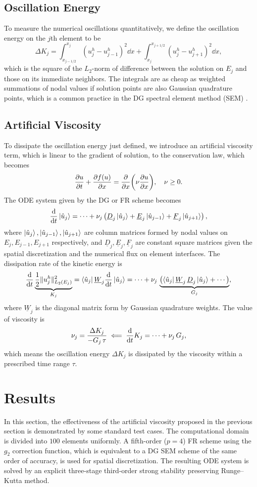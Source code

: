 \documentclass[10pt]{article}
\begin{document}
\subsection{Oscillation Energy}
To measure the numerical oscillations quantitatively, we define the oscillation energy on the $j$th element to be
$$
\Delta K_j = \int_{x_{j-1/2}}^{x_{j}}\left(u_{j}^{h}-u_{j-1}^{h}\right)^{2}\dd{x}+\int_{x_{j}}^{x_{j+1/2}}\left(u_{j}^{h}-u_{j+1}^{h}\right)^{2}\dd{x},
$$
which is the square of the $L_2$-norm of difference between the solution on $E_j$ and those on its immediate neighbors.
The integrals are as cheap as weighted summations of nodal values if solution points are also Gaussian quadrature points, which is a common practice in the DG spectral element method (SEM) \cite{Li_2020}.

\subsection{Artificial Viscosity}
To dissipate the oscillation energy just defined, we introduce an artificial viscosity term, which is linear to the gradient of solution, to the conservation law, which becomes
$$
\pdv{u}{t}+\pdv{f(u)}{x}=\pdv{x}\qty(\nu\pdv{u}{x}),\quad \nu \ge 0.
$$
The ODE system given by the DG or FR scheme becomes
$$
\dv{t}\ket{\hat{u}_{j}}=\cdots+\nu_{j}\left(\underline{D}_{j}\ket{\hat{u}_{j}}+\underline{E}_{j}\ket{\hat{u}_{j-1}}+\underline{F}_{j}\ket{\hat{u}_{j+1}}\right),
$$
where $\ket{\hat{u}_{j}}, \ket{\hat{u}_{j-1}}, \ket{\hat{u}_{j+1}}$ are column matrices formed by nodal values on $E_{j}, E_{j-1}, E_{j+1}$ respectively, and $ \underline{D}_{j}, \underline{E}_{j}, \underline{F}_{j} $ are constant square matrices given the spatial discretization and the numerical flux on element interfaces.
The dissipation rate of the kinetic energy is
$$
\dv{t}\underbrace{\frac{1}{2}\Vert u_{j}^{h}\Vert_{L_{2}(E_{j})}^{2}}_{K_{j}}=\bra{\hat{u}_{j}}\underline{W}_{j}\dv{t}\ket{\hat{u}_{j}}=\cdots+\nu_{j}\,\underbrace{\left(\bra{\hat{u}_{j}}\underline{W}_{j}\,\underline{D}_{j}\ket{\hat{u}_{j}}+\cdots\right)}_{G_{j}},
$$
where $\underline{W}_{j}$ is the diagonal matrix form by Gaussian quadrature weights.
The value of viscosity is
$$
\nu_{j}=\frac{\Delta K_{j}}{-G_{j}\,\tau}\impliedby\dv{t}K_{j}=\cdots+\nu_{j}\,G_{j},
$$
which means the oscillation energy $\Delta K_{j}$ is dissipated by the viscosity within a prescribed time range $\tau$.

\section{Results}
In this section, the effectiveness of the artificial viscosity proposed in the previous section is demonstrated by some standard test cases.
The computational domain is divided into $100$ elements uniformly.
A fifth-order ($p=4$) FR scheme using the $g_2$ correction function, which is equivalent to a DG SEM scheme of the same order of accuracy, is used for spatial discretization.
The resulting ODE system is solved by an explicit three-stage third-order strong stability preserving Runge--Kutta method.
\end{document}

